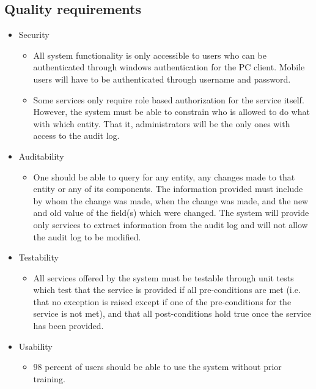 \documentclass[11pt]{article}
\begin{document}
\subsection{Quality requirements}
\begin{itemize}
\item Security
	\begin{itemize}
	\item All system functionality is only accessible to users who can be authenticated through windows authentication for the PC client. Mobile users will have to be authenticated through username and password.
\item Some services only require role based authorization for the service itself. However, the system must be able to constrain who is allowed to do what with which entity. That it, administrators will be the only ones with access to the audit log.
	\end{itemize}
\end{itemize}
\begin{itemize}
\item Auditability
	\begin{itemize}
	\item One should be able to query for any entity, any changes made to that entity or any of its components. The information provided must include by whom the change was made, when the change was made, and the new and old value of the field(s) which were changed. The system will provide only services to extract information from the audit log and will not allow the audit log to be modified.
	\end{itemize}
\end{itemize}
\begin{itemize}
\item Testability
	\begin{itemize}
	\item All services offered by the system must be testable through unit tests which test that the service is provided if all pre-conditions are met (i.e. that no exception is raised except if one of the pre-conditions for the service is not met), and that all post-conditions hold true once the service has been provided.
	\end{itemize}
\end{itemize}	
\begin{itemize}
\item Usability
	\begin{itemize}
	\item 98 percent of users should be able to use the system without prior training.
	\end{itemize}
\end{itemize}
\end{document}
